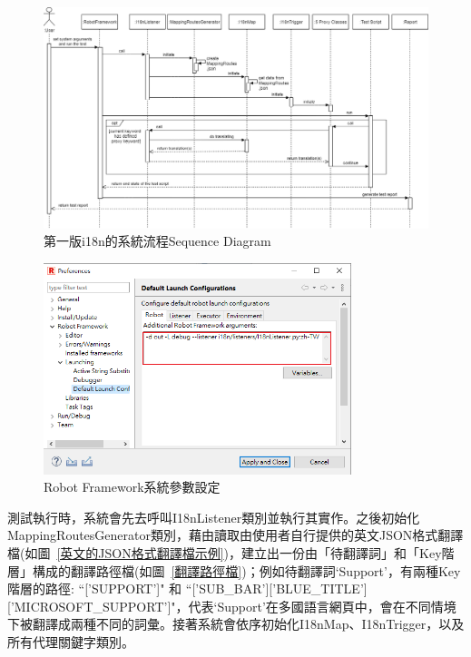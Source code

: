 \begin{figure}[H]
    \includegraphics[width= 1.15\textwidth]{../UML/i18n sequence diagram-第一版i18n系統流程.png}
    \caption{第一版i18n的系統流程Sequence Diagram}
    \label{1stI18nSequenceDiagram}
\end{figure}

\begin{figure}[H]
    \centering
    \includegraphics[width= 0.8\textwidth]{../論文截圖/3-1-3-1 設定系統參數.png}
    \caption{Robot Framework系統參數設定}
    \label{rfSysArgsSetting}
\end{figure}
測試執行時，系統會先去呼叫I18nListener類別並執行其實作。之後初始化MappingRoutesGenerator類別，藉由讀取由使用者自行提供的英文JSON格式翻譯檔(如圖~\ref{英文的JSON格式翻譯檔示例})，建立出一份由「待翻譯詞」和「Key階層」構成的翻譯路徑檔(如圖~\ref{翻譯路徑檔})；例如待翻譯詞‘Support’，有兩種Key階層的路徑: “['SUPPORT']" 和 “['SUB\_BAR']['BLUE\_TITLE']['MICROSOFT\_SUPPORT']"，代表‘Support’在多國語言網頁中，會在不同情境下被翻譯成兩種不同的詞彙。接著系統會依序初始化I18nMap、I18nTrigger，以及所有代理關鍵字類別。

